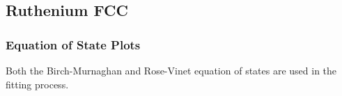 
\clearpage
\FloatBarrier
\subsection{Ruthenium FCC}




\subsubsection{Equation of State Plots}

Both the Birch-Murnaghan and Rose-Vinet equation of states are used in the fitting process.

